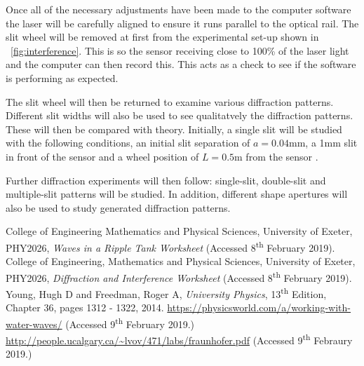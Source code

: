 \documentclass{article}
\newcommand{\figref}[2][\figurename~]{#1\ref{#2}}
\begin{document}
\vspace{2mm}
\noindent
Once all of the necessary adjustments have been made to the computer software the laser will be carefully aligned to ensure it runs parallel to the optical rail. The slit wheel will be removed at first from the experimental set-up shown in \figref{fig:interference}. This is so the sensor receiving close to 100\% of the laser light \cite{Paper02} and the computer can then record this. This acts as a check to see if the software is performing as expected.

\vspace{2mm}
\noindent
The slit wheel will then be returned to examine various diffraction patterns. Different slit widths will also be used to see qualitatvely \cite{Paper02} the diffraction patterns. These will then be compared with theory. Initially, a single slit will be studied with the following conditions, an initial slit separation of $a = 0.04$mm, a 1mm slit in front of the sensor and a wheel position of $L = 0.5$m from the sensor \cite{Paper02}. 

\vspace{2mm}
\noindent
Further diffraction experiments will then follow: single-slit, double-slit and multiple-slit patterns will be studied. In addition, different shape apertures will also be used to study generated diffraction patterns.   












\begin{thebibliography}{9}
 College of Engineering Mathematics and Physical Sciences, University of Exeter, PHY2026, \textit{Waves in a Ripple Tank Worksheet} (Accessed 8\textsuperscript{th} February 2019).
 College of Engineering, Mathematics and Physical Sciences, University of Exeter, PHY2026, \textit{Diffraction and Interference Worksheet} (Accessed 8\textsuperscript{th} February 2019).
 Young, Hugh D and Freedman, Roger A, \textit{University Physics}, 13\textsuperscript{th} Edition, Chapter 36, pages 1312 - 1322, 2014.
 \url{https://physicsworld.com/a/working-with-water-waves/} (Accessed 9\textsuperscript{th} February 2019.)
 \url{http://people.ucalgary.ca/~lvov/471/labs/fraunhofer.pdf} (Accessed 9\textsuperscript{th} Febraury 2019.)
\end{thebibliography}
\end{document}
